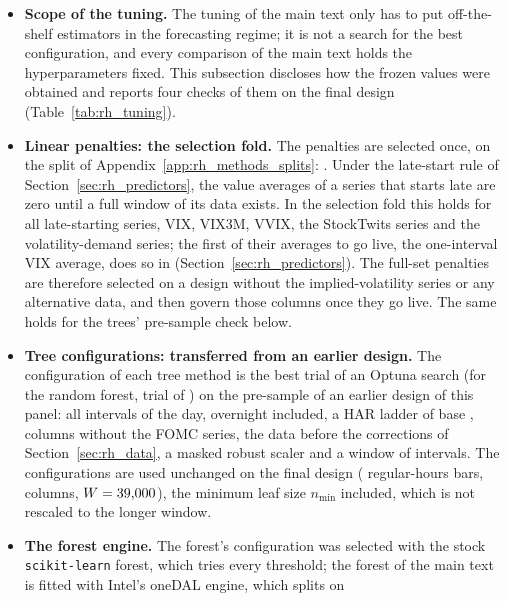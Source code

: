 \begin{itemize}
\item \textbf{Scope of the tuning.} The tuning of the main text only has to put off-the-shelf estimators in the
  forecasting regime; it is not a search for the best configuration, and every comparison of the main text holds the
  hyperparameters fixed. This subsection discloses how the frozen values were obtained and reports four checks of
  them on the final design (Table~\ref{tab:rh_tuning}).
\item \textbf{Linear penalties: the selection fold.} The penalties are selected once, on the split of
  Appendix~\ref{app:rh_methods_splits}: \rhorPenSample. Under the late-start rule of Section~\ref{sec:rh_predictors}, the value
  averages of a series that starts late are zero until a full window of its data exists. In the selection fold this
  holds for all \rhtuNLateSeries{} late-starting series, %
  VIX, VIX3M, VVIX, the StockTwits series and the volatility-demand series; the first of their averages to
  go live, the one-interval VIX average, does so in \rhlvVixLiveYear{} (Section~\ref{sec:rh_predictors}). The full-set penalties are therefore selected on a design without the implied-volatility series or any alternative
  data, and then govern those columns once they go live. The same holds for the trees' pre-sample check below.
\item \textbf{Tree configurations: transferred from an earlier design.} The configuration of each tree method is the
  best trial of an Optuna search \citep{Akiba2019} (for the random forest, trial \rhdmRfTrial{} of
  \cmTreeProvRfTrials) on the \rhtuTreeSearchSpan{} pre-sample of an earlier design of this panel: %
  all \rhdmNIntervals{} intervals of the day, overnight included, a HAR ladder of base \rhtuTreeHarBase{}, %
  \rhtuTreeNCols{} columns without the FOMC series, %
  the data before the corrections of Section~\ref{sec:rh_data}, a masked robust scaler and a window of
  \rhdmPooledWindow{} intervals. The configurations are used unchanged on the final design (\rhorNBars{} regular-hours
  bars, \rhorNColsAf{} columns, $W = 39{,}000$), the minimum leaf size $n_{\min}$ included, which is not
  rescaled to the longer window.
\item \textbf{The forest engine.} The forest's configuration was selected with the stock \texttt{scikit-learn} forest,
  which tries every threshold; the forest of the main text is fitted with Intel's oneDAL engine, which splits on

\end{itemize}
